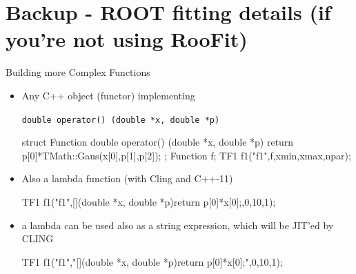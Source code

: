 \documentclass[aspectratio=169]{beamer}
\begin{document}
\section{Backup - ROOT fitting details (if you're not using RooFit)}

\begin{frame}[fragile]{Building more Complex Functions}
\begin{itemize}
    \item{Any C++ object (functor) implementing}
    \begin{center}
        \texttt{double operator() (double *x, double *p)}
    \end{center}
            \begin{myterminal}
struct Function {
    double operator() (double *x, double *p){
        return p[0]*TMath::Gaus(x[0],p[1],p[2]);
    }
};
Function f;
TF1 f1("f1",f,xmin,xmax,npar);
            \end{myterminal}
    \item{Also a lambda function (with Cling and C++-11)}
            \begin{myterminal}
TF1 f1("f1",[](double *x, double *p){return p[0]*x[0];},0,10,1);
            \end{myterminal}
    \item{a lambda can be used also as a string expression, which will be JIT’ed by CLING}
            \begin{myterminal}
TF1 f1("f1","[](double *x, double *p){return p[0]*x[0];}",0,10,1);
            \end{myterminal}
\end{itemize}
\end{frame}
\end{document}
